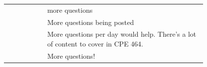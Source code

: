 \begin{longtable}{r|p{0.8\linewidth}}
		& more questions                                                                                                                                                                                                                                                                                                                                                                                                                                                                                                                                                                                                                                                                                                                                   \\
		& More questions being posted                                                                                                                                                                                                                                                                                                                                                                                                                                                                                                                                                                                                                                                                                                                      \\
		& More questions per day would help. There's a lot of content to cover in CPE 464.                                                                                                                                                                                                                                                                                                                                                                                                                                                                                                                                                                                                                                                                 \\
		& More questions!                                                                                                                                                                                                                                                                                                                                                                                                                                                                                                                                                                                                                                                                                                                                  \\

\end{longtable}
